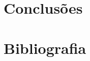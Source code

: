 \documentclass[12pt,a4paper]{article}
\begin{document}
\section{Conclusões}


\section{Bibliografia}
\end{document}
